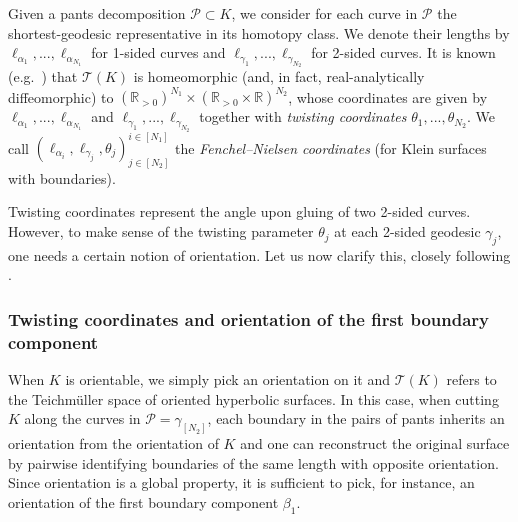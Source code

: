 \documentclass[12pt]{amsart}
\theoremstyle{plain}
\theoremstyle{definition}
\theoremstyle{remark}
\numberwithin{equation}{section}
\begin{document}
Given a pants decomposition $\mathcal{P}\subset K$, we consider for each curve in $\mathcal{P}$ the shortest-geodesic representative in its homotopy class. We denote their lengths by $\ell_{\alpha_1},...,\ell_{\alpha_{N_1}}$ for 1-sided curves and $\ell_{\gamma_1},...,\ell_{\gamma_{N_2}}$ for 2-sided curves. It is known (e.g.~\cite[Theorem 2.2]{PP13}) that $\mathcal{T}(K)$ is homeomorphic (and, in fact, real-analytically diffeomorphic) to $(\mathbb{R}_{>0})^{N_1}\times(\mathbb{R}_{>0}\times\mathbb{R})^{N_2}$, whose coordinates are given by $\ell_{\alpha_1},...,\ell_{\alpha_{N_1}}$ and $\ell_{\gamma_1},...,\ell_{\gamma_{N_2}}$ together with \emph{twisting coordinates} $\theta_1,...,\theta_{N_2}$. We call $(\ell_{\alpha_i},\ell_{\gamma_j},\theta_j)^{i\in[N_1]}_{j\in[N_2]}$ the \emph{Fenchel--Nielsen coordinates} (for Klein surfaces with boundaries).

Twisting coordinates represent the angle upon gluing of two 2-sided curves. However, to make sense of the twisting parameter $\theta_j$ at each 2-sided geodesic $\gamma_j$, one needs a certain notion of orientation. Let us now clarify this, closely following \cite{Nor07}. 

\subsubsection{Twisting coordinates and orientation of the first boundary component}\label{sec:twist coordinates}



When $K$ is orientable, we simply pick an orientation on it and $\mathcal{T}(K)$ refers to the Teichm\"{u}ller space of oriented hyperbolic surfaces. In this case, when cutting $K$ along the curves in $\mathcal{P}=\gamma_{[N_2]}$, each boundary in the pairs of pants inherits an orientation from the orientation of $K$ and one can reconstruct the original surface by pairwise identifying boundaries of the same length with opposite orientation. Since orientation is a global property, it is sufficient to pick, for instance, an orientation of the first boundary component $\beta_1$.
\end{document}
